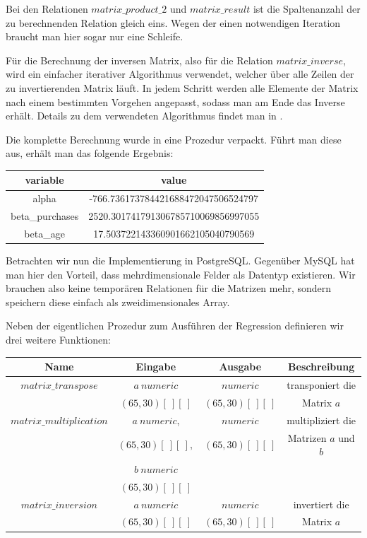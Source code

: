 Bei den Relationen $matrix\_product\_2$ und $matrix\_result$ ist die Spaltenanzahl der zu berechnenden Relation gleich eins. Wegen der einen notwendigen Iteration braucht man hier sogar nur eine Schleife.

Für die Berechnung der inversen Matrix, also für die Relation $matrix\_inverse$, wird ein einfacher iterativer Algorithmus verwendet, welcher über alle Zeilen der zu invertierenden Matrix läuft. In jedem Schritt werden alle Elemente der Matrix nach einem bestimmten Vorgehen angepasst, sodass man am Ende das Inverse erhält. Details zu dem verwendeten Algorithmus findet man in \cite{matrix}.

Die komplette Berechnung wurde in eine Prozedur verpackt. Führt man diese aus, erhält man das folgende Ergebnis:

\begin{center}
  \begin{tabular}{|c|c|}\hline
    \textbf{variable} & \textbf{value} \\ \hline
    alpha & -766.736173784421688472047506524797 \\ \hline
    beta\_purchases & 2520.301741791306785710069856997055 \\ \hline
    beta\_age & 17.503722143360901662105040790569 \\ \hline
  \end{tabular}
\end{center}

Betrachten wir nun die Implementierung in PostgreSQL. Gegenüber MySQL hat man hier den Vorteil, dass mehrdimensionale Felder als Datentyp existieren. Wir brauchen also keine temporären Relationen für die Matrizen mehr, sondern speichern diese einfach als zweidimensionales Array.

Neben der eigentlichen Prozedur zum Ausführen der Regression definieren wir drei weitere Funktionen:
\begin{center}
  \begin{tabular}{|c|c|c|c|}\hline
    \textbf{Name} & \textbf{Eingabe} & \textbf{Ausgabe} & \textbf{Beschreibung} \\ \hline
    $matrix\_transpose$ & $a ~ numeric$ & $numeric$ & transponiert die \\
     & $(65, 30)[~][~]$ & $(65, 30)[~][~]$ & Matrix $a$ \\ \hline
    $matrix\_multiplication$ & $a ~ numeric$, & $numeric$ & multipliziert die \\
     & $(65, 30)[~][~],$ & $(65, 30)[~][~]$ & Matrizen $a$ und $b$ \\
     & $b ~ numeric$ & & \\
     & $(65, 30)[~][~]$ & & \\ \hline
    $matrix\_inversion$ & $a ~ numeric$ & $numeric$ & invertiert die \\
     & $(65, 30)[~][~]$ & $(65, 30)[~][~]$ & Matrix $a$ \\ \hline
  \end{tabular}
\end{center}

